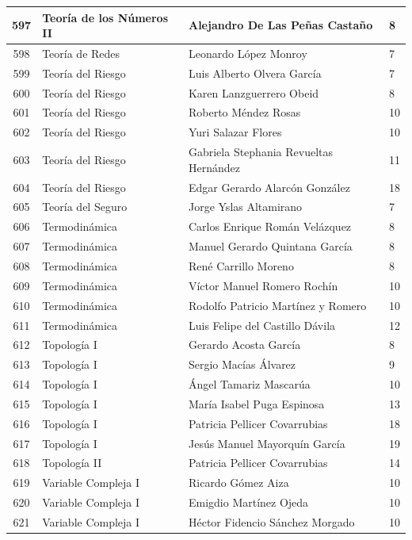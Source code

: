 {\begin{longtable}{|c|p{6.5cm}|p{5cm}|p{1.5cm}|}
  597 & Teoría de los Números II & Alejandro De Las Peñas Castaño & 8 \\ \hline
  598 & Teoría de Redes & Leonardo López Monroy & 7 \\ \hline
  599 & Teoría del Riesgo & Luis Alberto Olvera García & 7 \\ \hline
  600 & Teoría del Riesgo & Karen Lanzguerrero Obeid & 8 \\ \hline
  601 & Teoría del Riesgo & Roberto Méndez Rosas & 10 \\ \hline
  602 & Teoría del Riesgo & Yuri Salazar Flores & 10 \\ \hline
  603 & Teoría del Riesgo & Gabriela Stephania Revueltas Hernández & 11 \\ \hline
  604 & Teoría del Riesgo & Edgar Gerardo Alarcón González & 18 \\ \hline
  605 & Teoría del Seguro & Jorge Yslas Altamirano & 7 \\ \hline
  606 & Termodinámica & Carlos Enrique Román Velázquez & 8 \\ \hline
  607 & Termodinámica & Manuel Gerardo Quintana García & 8 \\ \hline
  608 & Termodinámica & René Carrillo Moreno & 8 \\ \hline
  609 & Termodinámica & Víctor Manuel Romero Rochín & 10 \\ \hline
  610 & Termodinámica & Rodolfo Patricio Martínez y Romero & 10 \\ \hline
  611 & Termodinámica & Luis Felipe del Castillo Dávila & 12 \\ \hline
  612 & Topología I & Gerardo Acosta García & 8 \\ \hline
  613 & Topología I & Sergio Macías Álvarez & 9 \\ \hline
  614 & Topología I & Ángel Tamariz Mascarúa & 10 \\ \hline
  615 & Topología I & María Isabel Puga Espinosa & 13 \\ \hline
  616 & Topología I & Patricia Pellicer Covarrubias & 18 \\ \hline
  617 & Topología I & Jesús Manuel Mayorquín García & 19 \\ \hline
  618 & Topología II & Patricia Pellicer Covarrubias & 14 \\ \hline
  619 & Variable Compleja I & Ricardo Gómez Aiza & 10 \\ \hline
  620 & Variable Compleja I & Emigdio Martínez Ojeda & 10 \\ \hline
  621 & Variable Compleja I & Héctor Fidencio Sánchez Morgado & 10 \\ \hline

\end{longtable}}
